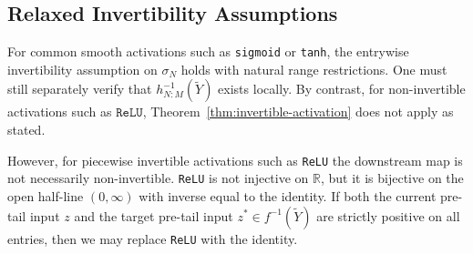 \documentclass{article}
\theoremstyle{plain}
\theoremstyle{definition}
\theoremstyle{remark}
\begin{document}



\subsection{Relaxed Invertibility Assumptions}\label{relax}
For common smooth activations such as \texttt{sigmoid} or \texttt{tanh}, the entrywise invertibility assumption on \(\sigma_N\) holds with natural range restrictions. One must still separately verify that \(h_{N:M}^{-1}(\tilde Y)\) exists locally. By contrast, for non-invertible activations such as $\texttt{ReLU}$, Theorem~\ref{thm:invertible-activation} does not apply as stated. 

However, for piecewise invertible activations such as \texttt{ReLU} the downstream map is not necessarily non-invertible. \texttt{ReLU} is not injective on $\mathbb{R}$, but it is bijective on the open half-line $(0,\infty)$ with inverse equal to the identity. If both the current pre-tail input $z$ and the target pre-tail input $z^\ast\in f^{-1}(\tilde Y)$ are strictly positive on all entries, then we may replace \texttt{ReLU} with the identity. 
\end{document}
